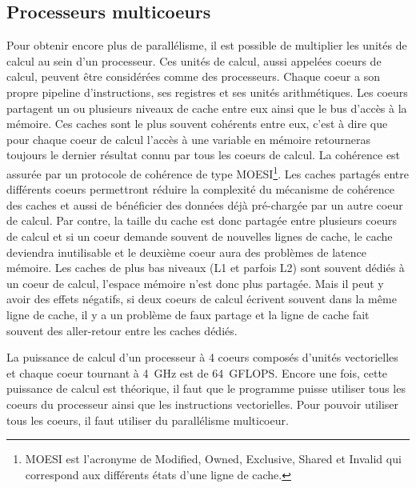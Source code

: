 \subsection{Processeurs multicoeurs}
Pour obtenir encore plus de parallélisme, il est possible de multiplier les unités de calcul au sein d'un processeur.
%
Ces unités de calcul, aussi appelées coeurs de calcul, peuvent être considérées comme des processeurs.
%
Chaque coeur a son propre pipeline d'instructions, ses registres et ses unités arithmétiques.
%
Les coeurs partagent un ou plusieurs niveaux de cache entre eux ainsi que le bus d'accès à la mémoire.
%
Ces caches sont le plus souvent cohérents entre eux, c'est à dire que pour chaque coeur de calcul l'accès à une variable en mémoire retourneras toujours le dernier résultat connu par tous les coeurs de calcul.
%
La cohérence est assurée par un protocole de cohérence de type MOESI\footnote{MOESI est l'acronyme de Modified, Owned, Exclusive, Shared et Invalid qui correspond aux différents états d'une ligne de cache.}.
%
Les caches partagés entre différents coeurs permettront réduire la complexité du mécanisme de cohérence des caches et aussi de bénéficier des données déjà pré-chargée par un autre coeur de calcul.
%
Par contre, la taille du cache est donc partagée entre plusieurs coeurs de calcul et si un coeur demande souvent de nouvelles lignes de cache, le cache deviendra inutilisable et le deuxième coeur aura des problèmes de latence mémoire.
%
Les caches de plus bas niveaux (L1 et parfois L2) sont souvent dédiés à un coeur de calcul, l'espace mémoire n'est donc plus partagée.
%
Mais il peut y avoir des effets négatifs, si deux coeurs de calcul écrivent souvent dans la même ligne de cache, il y a un problème de faux partage et la ligne de cache fait souvent des aller-retour entre les caches dédiés.



La puissance de calcul d'un processeur à 4 coeurs composés d'unités vectorielles et chaque coeur tournant à 4~GHz est de 64~GFLOPS.
%
Encore une fois, cette puissance de calcul est théorique, il faut que le programme puisse utiliser tous les coeurs du processeur ainsi que les instructions vectorielles.
%
Pour pouvoir utiliser tous les coeurs, il faut utiliser du parallélisme multicoeur.

